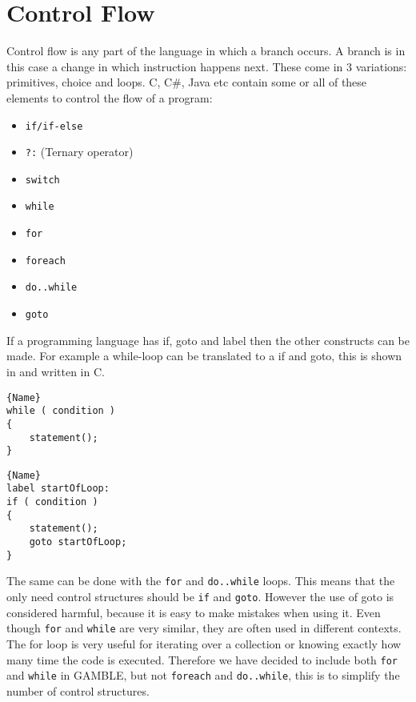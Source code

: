 \section{Control Flow}\label{subsec:control-flow}
Control flow is any part of the language in which a branch occurs. 
A branch is in this case a change in which instruction happens next. 
These come in 3 variations: primitives, choice and loops.
C, C\#, Java etc contain some or all of these elements to control the flow of a program:

\begin{itemize}
    \item \texttt{if/if-else}
    \item \texttt{?:} (Ternary operator)
    \item \texttt{switch}
    \item \texttt{while}
    \item \texttt{for}
    \item \texttt{foreach}
    \item \texttt{do..while}
    \item \texttt{goto}
\end{itemize}

If a programming language has if, goto and label then the other constructs can be made.
For example a while-loop can be translated to a if and goto, this is shown in  and  written in C. 

\noindent\begin{minipage}{.45\textwidth}
\begin{lstlisting}[caption=Loop made with while.,frame=tlrb, label=ifgotowhile1, numbers=none]{Name}
while ( condition )
{
    statement();
}
\end{lstlisting}
\end{minipage}\hfill
\begin{minipage}{.45\textwidth}
\begin{lstlisting}[caption=The same loop with if and goto.,frame=tlrb, label=ifgotowhile2, numbers=none]{Name}
label startOfLoop:
if ( condition )
{
    statement();
    goto startOfLoop;
}
\end{lstlisting}
\end{minipage}

The same can be done with the \texttt{for} and \texttt{do..while} loops. 
This means that the only need control structures should be \texttt{if} and \texttt{goto}. 
However the use of goto is considered harmful, because it is easy to make mistakes when using it. \citep{DijkstraGoto}
Even though \texttt{for} and \texttt{while} are very similar, they are often used in different contexts.
The for loop is very useful for iterating over a collection or knowing exactly how many time the code is executed. 
Therefore we have decided to include both \texttt{for} and \texttt{while} in GAMBLE, but not \texttt{foreach} and \texttt{do..while}, this is to simplify the number of control structures.

